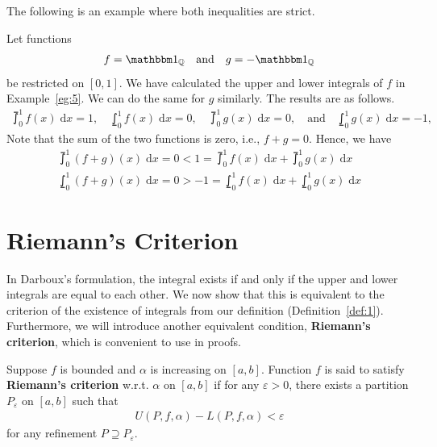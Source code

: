 \documentclass[thmcnt=section, 12pt]{my-elegantbook}
\begin{document}
The following is an example where both inequalities are strict.

\begin{example}
    Let functions
    \begin{align*}
        f = \ind_\Q 
        \quad \text{and} \quad 
        g = -\ind_\Q
    \end{align*}
    be restricted on $[0, 1]$. We have calculated the upper and lower integrals of $f$ in Example~\ref{eg:5}. We can do the same for $g$ similarly. The results are as follows.
    \begin{align*}
        \upint_0^1 f(x) \; \mathrm{d}x = 1,
        \quad 
        \lowint_0^1 f(x) \; \mathrm{d}x = 0,
        \quad
        \upint_0^1 g(x) \; \mathrm{d}x = 0,
        \quad \text{and} \quad
        \lowint_0^1 g(x) \; \mathrm{d}x = -1,
    \end{align*}
    Note that the sum of the two functions is zero, i.e., $f + g = 0$. Hence, we have
    \begin{align*}
        \upint_0^1 (f+g)(x) \; \mathrm{d}x 
        = 0 
        < 1 
        = \upint_0^1 f(x) \; \mathrm{d}x + \upint_0^1 g(x) \; \mathrm{d}x \\
        \lowint_0^1 (f+g)(x) \; \mathrm{d}x 
        = 0
        > -1 
        = \lowint_0^1 f(x) \; \mathrm{d}x + \lowint_0^1 g(x) \; \mathrm{d}x
    \end{align*}
\end{example}


\section{Riemann's Criterion}

In Darboux's formulation, the integral exists if and only if the upper and lower integrals are equal to each other. We now show that this is equivalent to the criterion of the existence of integrals from our definition (Definition~\ref{def:1}). Furthermore, we will introduce another equivalent condition, \textbf{Riemann's criterion}, which is convenient to use in proofs.

\begin{definition}
    Suppose $f$ is bounded and $\alpha$ is increasing on $[a, b]$. Function $f$ is said to satisfy \textbf{Riemann's criterion} w.r.t. $\alpha$ on $[a, b]$ if for any $\varepsilon > 0$, there exists a partition $P_\varepsilon$ on $[a, b]$ such that 
    \begin{align*}
        U(P,f,\alpha) - L(P,f,\alpha) < \varepsilon
    \end{align*}
    for any refinement $P \supseteq P_\varepsilon$.
\end{definition}
\end{document}
